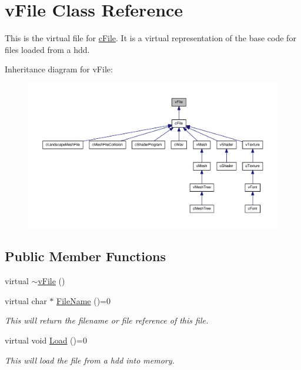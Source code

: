 \hypertarget{classv_file}{
\section{vFile Class Reference}
\label{classv_file}
}


This is the virtual file for \hyperlink{classc_file}{cFile}. It is a virtual representation of the base code for files loaded from a hdd.  




Inheritance diagram for vFile:
\nopagebreak
\begin{figure}[H]
\begin{center}
\leavevmode
\includegraphics[width=400pt]{classv_file__inherit__graph}
\end{center}
\end{figure}
\subsection*{Public Member Functions}
\begin{DoxyCompactItemize}
\item 
virtual \hyperlink{classv_file_aa8a321d9480d4f0f220cbc24223fceab}{$\sim$vFile} ()
\item 
virtual char $\ast$ \hyperlink{classv_file_a34a809462f9074a0b82a913f3c9bd955}{FileName} ()=0
\begin{DoxyCompactList}\small\item\em This will return the filename or file reference of this file. \item\end{DoxyCompactList}\item 
virtual void \hyperlink{classv_file_a7478cc6459dfe5c11bcf55555f652f3d}{Load} ()=0
\begin{DoxyCompactList}\small\item\em This will load the file from a hdd into memory. \item\end{DoxyCompactList}\end{DoxyCompactItemize}


